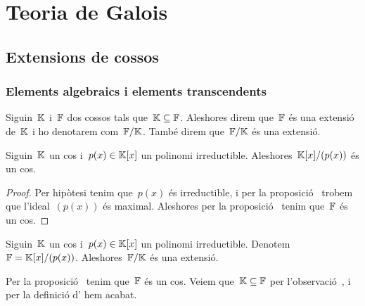 \documentclass[../teoria-de-Galois.tex]{subfiles}
\begin{document}
\chapter{Teoria de Galois}
\section{Extensions de cossos}
\subsection{Elements algebraics i elements transcendents}
    \begin{definition}
        \label{def:extensio-de-cossos}
        Siguin~\(\mathbb{K}\) i~\(\mathbb{F}\) dos cossos tals que~\(\mathbb{K}\subseteq\mathbb{F}\).
        Aleshores direm que~\(\mathbb{F}\) és una extensió de~\(\mathbb{K}\) i ho denotarem com~\(\mathbb{F}/\mathbb{K}\).
        També direm que~\(\mathbb{F}/\mathbb{K}\) és una extensió.
    \end{definition}
    \begin{proposition} %
        \label{prop:un-cos-quocient-un-irreductible-es-un-cos}
        Siguin~\(\mathbb{K}\) un cos i~\(p(x)\in\mathbb{K}[x]\) un polinomi irreductible.
        Aleshores~\(\mathbb{K}[x]/(p(x))\) és un cos.
    \end{proposition}
    \begin{proof} %
        Per hipòtesi tenim que~\(p(x)\) és irreductible, i per la proposició~ trobem que l'ideal~\((p(x))\) és maximal.
        Aleshores per la proposició~ tenim que~\(\mathbb{F}\) és un cos.
    \end{proof}
    \begin{example}
        \label{ex:el-cos-de-polinomis-es-una-extensio}
        Siguin~\(\mathbb{K}\) un cos i~\(p(x)\in\mathbb{K}[x]\) un polinomi irreductible.
        Denotem~\(\mathbb{F}=\mathbb{K}[x]/(p(x))\).
        Aleshores~\(\mathbb{F}/\mathbb{K}\) és una extensió.
    \end{example}
    \begin{solution}
        Per la proposició~ tenim que~\(\mathbb{F}\) és un cos.
        Veiem que~\(\mathbb{K}\subseteq\mathbb{F}\) per l'observació~, i per la definició d' hem acabat.
    \end{solution}
\end{document}
